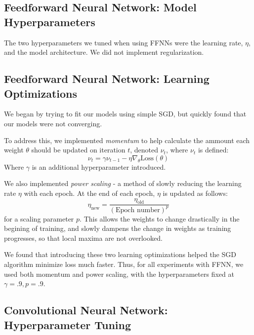 \documentclass[letterpaper, 10 pt, conference]{ieeeconf}  %
\begin{document}
\subsection{Feedforward Neural Network: Model Hyperparameters} 

The two hyperparameters we tuned when using FFNNs were the learning rate, $\eta$, and the model architecture. We did not implement regularization.

\subsection{Feedforward Neural Network: Learning Optimizations} 

We began by trying to fit our models using simple SGD, but quickly found that our models were not converging. 

To address this, we implemented \emph{momentum} to help calculate the ammount each weight $\theta$ should be updated on iteration $t$, denoted $\nu_t$, where $\nu_t$ is defined:
$$
\nu_t = \gamma\nu_{t-1} - \eta\nabla_{\theta}\text{Loss}(\theta)
$$
Where $\gamma$ is an additional hyperparameter introduced. 

We also implemented \emph{power scaling} - a method of slowly reducing the learning rate $\eta$ with each epoch. At the end of each epoch, $\eta$ is updated as follows:
$$
\eta_{\text{new}} = \frac{\eta_{\text{old}}}{(\text{Epoch number})^{p}}
$$
for a scaling parameter $p$. This allows the weights to change drastically in the begining of training, and slowly dampens the change in weights as training progresses, so that local maxima are not overlooked. 

We found that introducing these two learning optimizations helped the SGD algorithm minimize loss much faster. Thus, for all experiments with FFNN, we used both momentum and power scaling, with the hyperparameters fixed at $\gamma = .9, p = .9$. 

\subsection{Convolutional Neural Network: Hyperparameter Tuning} 
\end{document}
